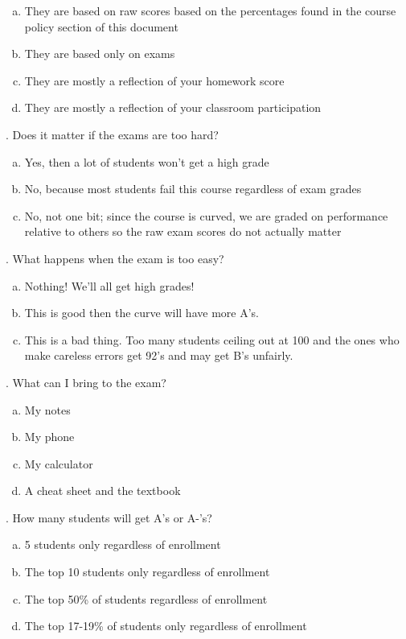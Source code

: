 \documentclass[12pt]{article}
\begin{document}
\begin{enumerate}[(a)]
\item They are based on raw scores based on the percentages found in the course policy section of this document
\item They are based only on exams
\item They are mostly a reflection of your homework score
\item They are mostly a reflection of your classroom participation
\end{enumerate}


. Does it matter if the exams are too hard?

\begin{enumerate}[(a)]
\item Yes, then a lot of students won't get a high grade
\item No, because most students fail this course regardless of exam grades
\item No, not one bit; since the course is curved, we are graded on performance relative to others so the raw exam scores do not actually matter
\end{enumerate}

. What happens when the exam is too easy? 

\begin{enumerate}[(a)]
\item Nothing! We'll all get high grades!
\item This is good then the curve will have more A's.
\item This is a bad thing. Too many students ceiling out at 100 and the ones who make careless errors get 92's and may get B's unfairly.
\end{enumerate}

. What can I bring to the exam?

\begin{enumerate}[(a)]
\item My notes
\item My phone
\item My calculator
\item A cheat sheet and the textbook
\end{enumerate}

. How many students will get A's or A-'s?

\begin{enumerate}[(a)]
\item 5 students only regardless of enrollment
\item The top 10 students only regardless of enrollment
\item The top 50\% of students regardless of enrollment
\item The top 17-19\% of students only regardless of enrollment
\end{enumerate}
\end{document}
